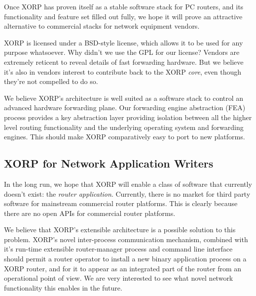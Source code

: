 Once XORP has proven itself as a stable software stack for PC routers,
and its functionality and feature set filled out fully, we hope it
will prove an attractive alternative to commercial stacks for network
equipment vendors.  

XORP is licensed under a BSD-style license, which allows it to be used
for any purpose whatsoever.  Why didn't we use the GPL for our
license?  Vendors are extremely reticent to reveal details of fast
forwarding hardware.  But we believe it's also in vendors interest to
contribute back to the XORP {\it core}, even though they're not
compelled to do so.

We believe XORP's architecture is well suited as a software stack to
control an advanced hardware forwarding plane.  Our forwarding engine
abstraction (FEA) process provides a key abstraction layer providing
isolation between all the higher level routing functionality and the
underlying operating system and forwarding engines.  This should make
XORP comparatively easy to port to new platforms.

\subsection{XORP for Network Application Writers}

In the long run, we hope that XORP will enable a class of software
that currently doesn't exist: the \textit{router application}.  Currently,
there is no market for third party software for mainstream commercial
router platforms.  This is clearly because there are no open APIs for
commercial router platforms.  

We believe that XORP's extensible architecture is a possible solution
to this problem.  XORP's novel inter-process communication mechanism,
combined with it's run-time extensible router-manager process and
command line interface should permit a router operator to install a
new binary application process on a XORP router, and for it to appear
as an integrated part of the router from an operational point of view.
We are very interested to see what novel network functionality this
enables in the future.
